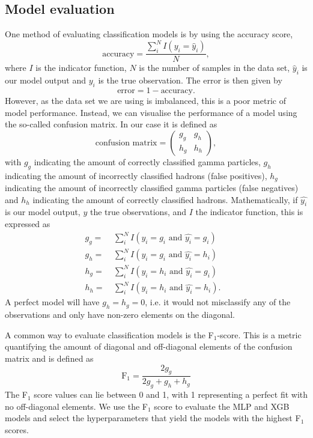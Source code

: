 \documentclass[a4paper, 11pt, twocolumn]{article}
\begin{document}
\subsection{Model evaluation}
One method of evaluating classification models is by using the accuracy score, 
\begin{equation}
\text{accuracy} = \frac{ \sum_i^N I(y_i=\hat{y}_i)}{N},
\end{equation}
where $I$ is the indicator function, $N$ is the number of samples in the data 
set, $\hat{y}_i$ is our model output and $y_i$ is the true observation. The 
error is then given by 
\begin{equation}
\text{error} = 1-\text{accuracy}. 
\end{equation}
However, as the data set we are using is imbalanced, this is a poor metric of 
model performance. 
Instead, we can visualise the performance of a model using the so-called 
confusion matrix. In our case it is defined as
\begin{equation}
\text{confusion matrix}=
\begin{pmatrix}
g_g & g_h \\
h_g & h_h
\end{pmatrix},
\label{eq:Confusion}
\end{equation}
with $g_g$ indicating the amount of correctly classified gamma particles, 
$g_h$ indicating the amount of incorrectly classified hadrons (false positives), 
$h_g$ indicating the amount of incorrectly classified gamma particles (false 
negatives) and $h_h$ indicating the amount of correctly classified hadrons. 
Mathematically, if $\hat{y_i}$ is our model output, $y$ the true observations, 
and $I$ the indicator function, this is expressed as
\begin{align*}
  g_g= &\ \sum_{i}^N I(y_i=g_i \text{ and } \hat{y_i}=g_i) &\\
  g_h= &\ \sum_{i}^N I(y_i=g_i \text{ and } \hat{y_i}=h_i)\\
  h_g= &\ \sum_{i}^N I(y_i=h_i \text{ and } \hat{y_i}=g_i)\\
  h_h= &\ \sum_{i}^N I(y_i=h_i \text{ and } \hat{y_i}=h_i).
\end{align*}
A perfect model will have $g_h=h_g=0$, i.e. it would not misclassify any of the 
observations and only have non-zero elements on the diagonal.

A common way to evaluate classification models is the F$_1$-score. This is a 
metric quantifying the amount of diagonal and off-diagonal elements of the 
confusion matrix and is defined as 
\begin{equation}
\text{F}_1=\frac{2 g_g}{2g_g + g_h + h_g}
\label{eq:F1}
\end{equation} 
The F$_1$ score values can lie between 0 and 1, with 1 representing a perfect 
fit with no off-diagonal elements. 
We use the F$_1$ score to evaluate the MLP and XGB models and select the 
hyperparameters that yield the models with the highest F$_1$ scores. 
\end{document}
